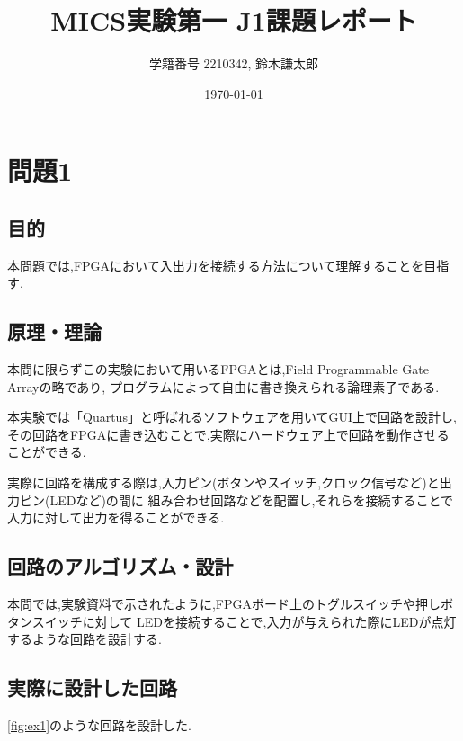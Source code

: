 \documentclass[autodetect-engine, dvi=dvipdfmx, 10pt, a4paper, ja=standard]{bxjsarticle}
\title{MICS実験第一 J1課題レポート}
\author{学籍番号 2210342, 鈴木謙太郎}
\date{\today}
\begin{document}
\maketitle



\section{問題1}

\subsection{目的}

本問題では,FPGAにおいて入出力を接続する方法について理解することを目指す.


\subsection{原理・理論}

本問に限らずこの実験において用いるFPGAとは,Field Programmable Gate Arrayの略であり,
プログラムによって自由に書き換えられる論理素子である.

本実験では「Quartus」と呼ばれるソフトウェアを用いてGUI上で回路を設計し,
その回路をFPGAに書き込むことで,実際にハードウェア上で回路を動作させることができる.

実際に回路を構成する際は,入力ピン(ボタンやスイッチ,クロック信号など)と出力ピン(LEDなど)の間に
組み合わせ回路などを配置し,それらを接続することで入力に対して出力を得ることができる.

\subsection{回路のアルゴリズム・設計}

本問では,実験資料で示されたように,FPGAボード上のトグルスイッチや押しボタンスイッチに対して
LEDを接続することで,入力が与えられた際にLEDが点灯するような回路を設計する.

\subsection{実際に設計した回路}

\ref{fig:ex1}のような回路を設計した.
\end{document}
